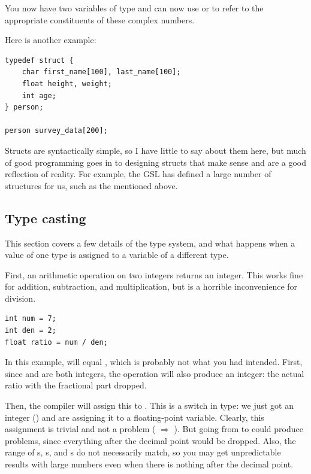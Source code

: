 You now have two variables of type  and can now use  or  to refer to the appropriate constituents
of these complex numbers. 

Here is another example:
\begin{lstlisting}
typedef struct {
    char first_name[100], last_name[100];
    float height, weight;
    int age;
} person;

person survey_data[200];
\end{lstlisting}

Structs are syntactically simple, so I have little to say about them here,
but much of good programming goes in to designing structs that make sense
and are a good reflection of reality.  For example, the GSL has defined
a large number of structures for us, such as the 
mentioned above.



\subsection{\treesymbol Type casting}\label{casting}   
This section covers a few details of the type system, and what happens
when a value of one type is assigned to a variable of a different type.

First, an arithmetic operation on two integers returns an integer. This works fine for
addition, subtraction, and multiplication, but is a horrible inconvenience for division.\\
\begin{lstlisting}
int num = 7;
int den = 2;
float ratio = num / den;
\end{lstlisting}
In this example,  will equal , which is probably not what you had intended. 
First, since  and  are both integers, the operation
 will also produce an integer: the actual ratio with the
fractional part dropped.

Then, the compiler will assign this to . This is a
switch in type: we just got an integer () and are assigning it to
a floating-point variable. Clearly, this assignment is trivial and
not a problem ( $\Rightarrow$ ).  But going from
 to  could produce problems, since everything after the decimal point
would be dropped.  Also, the range of s, s,
and s do not necessarily match, so you may get unpredictable
results with large numbers even when there is nothing after the decimal
point.

